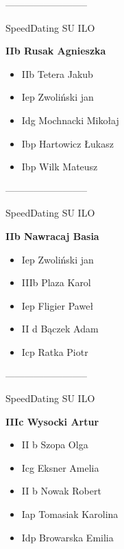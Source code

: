 \documentclass[a4paper,10pt]{article}
\begin{document}
\begin{multicols}{3}
\begin{minipage}[l]{\textwidth}
\begin{itemize}
    \end{itemize}



\end{minipage}



\begin{minipage}[l]{\textwidth}
--------------------------

  \footnotesize{SpeedDating SU ILO}

  \bfseries{IIb Rusak Agnieszka}

  \begin{itemize}
    \item IIb Tetera Jakub
    \item Iep Zwoliński jan
    \item Idg Mochnacki Mikołaj
    \item Ibp Hartowicz Łukasz
    \item Ibp Wilk Mateusz

    \end{itemize}



\end{minipage}



\begin{minipage}[l]{\textwidth}
--------------------------

  \footnotesize{SpeedDating SU ILO}

  \bfseries{IIb Nawracaj Basia}

  \begin{itemize}
    \item Iep Zwoliński jan
    \item IIIb Plaza Karol
    \item Iep Fligier Paweł
    \item II d Bączek Adam
    \item Icp Ratka Piotr

    \end{itemize}



\end{minipage}



\begin{minipage}[l]{\textwidth}
--------------------------

  \footnotesize{SpeedDating SU ILO}

  \bfseries{IIIc Wysocki Artur}

  \begin{itemize}
    \item II b Szopa Olga
    \item Icg Eksner Amelia
    \item II b Nowak Robert
    \item Iap Tomasiak Karolina
    \item Idp Browarska Emilia


\end{itemize}
\end{minipage}
\end{multicols}
\end{document}
